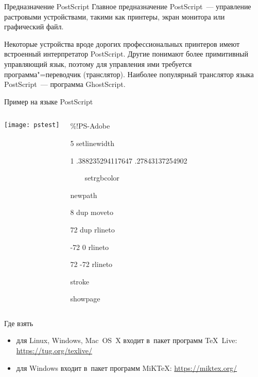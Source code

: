 
\begin{frame}{Предназначение PostScript}
Главное предназначение PostScript~— управление растровыми устройствами, такими
как принтеры, экран монитора или графический файл.

Некоторые устройства вроде дорогих профессиональных принтеров имеют встроенный
интерпретатор PostScript. Другие понимают более примитивный управляющий язык,
поэтому для управления ими требуется программа"=переводчик (транслятор).
Наиболее популярный транслятор языка PostScript~— программа GhostScript.
\end{frame}


\begin{frame}{Пример на языке PostScript}
\begin{columns}
\texttt{[image: pstest]}
\begin{programlisting}
\%!PS-Adobe\par
\leavevmode\par
5 setlinewidth\par
1 .388235294117647 .27843137254902\par
~~~~setrgbcolor\par
\leavevmode\par
newpath\par
8 dup moveto\par
72 dup rlineto\par
-72 0 rlineto\par
72 -72 rlineto\par
stroke\par
\leavevmode\par
showpage
\end{programlisting}
\end{columns}

\end{frame}


\begin{frame}{Где взять }
\begin{itemize}
\item
{} для Linux, Windows, Mac~OS~X входит в~пакет программ
\TeX~Live:
\url{https://tug.org/texlive/}
\item
{} для Windows входит в~пакет программ MiK\TeX:
\url{https://miktex.org/}
\end{itemize}
\end{frame}

